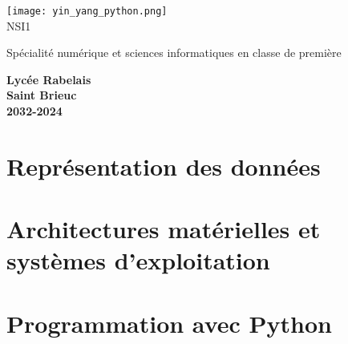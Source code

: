 \documentclass[10pt,a4paper]{nsibook}
\begin{document}
\begin{titlepage}
    \begin{center}
        \texttt{[image: yin\_yang\_python.png]}\\[2em]

        {\bigtitlefont \LARGE\color{gray} NSI1\\}

        {\titlefont\Large\color{gray} Spécialité numérique et sciences informatiques en classe de première\\[2em]}

        {\color{gray}\textbf{Lycée Rabelais\\ Saint Brieuc\\ 2032-2024}}
    \end{center}
\end{titlepage}
\part{Représentation des données}





\part{Architectures matérielles et \\systèmes d'exploitation}



\part{Programmation avec Python}





\tableofcontents
\end{document}
